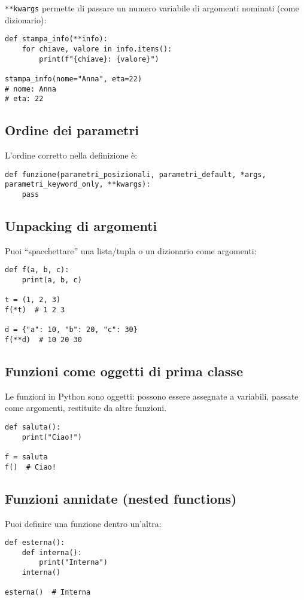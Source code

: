 \documentclass[a4paper,12pt]{article}
\begin{document}
\texttt{**kwargs} permette di passare un numero variabile di argomenti nominati (come dizionario):

\begin{lstlisting}
def stampa_info(**info):
    for chiave, valore in info.items():
        print(f"{chiave}: {valore}")

stampa_info(nome="Anna", eta=22)
# nome: Anna
# eta: 22
\end{lstlisting}

\subsection*{Ordine dei parametri}
L’ordine corretto nella definizione è:
\begin{lstlisting}
def funzione(parametri_posizionali, parametri_default, *args, parametri_keyword_only, **kwargs):
    pass
\end{lstlisting}

\subsection*{Unpacking di argomenti}
Puoi “spacchettare” una lista/tupla o un dizionario come argomenti:

\begin{lstlisting}
def f(a, b, c):
    print(a, b, c)

t = (1, 2, 3)
f(*t)  # 1 2 3

d = {"a": 10, "b": 20, "c": 30}
f(**d)  # 10 20 30
\end{lstlisting}

\subsection*{Funzioni come oggetti di prima classe}
Le funzioni in Python sono oggetti: possono essere assegnate a variabili, passate come argomenti, restituite da altre funzioni.

\begin{lstlisting}
def saluta():
    print("Ciao!")

f = saluta
f()  # Ciao!
\end{lstlisting}

\subsection*{Funzioni annidate (nested functions)}
Puoi definire una funzione dentro un’altra:

\begin{lstlisting}
def esterna():
    def interna():
        print("Interna")
    interna()

esterna()  # Interna
\end{lstlisting}
\end{document}

